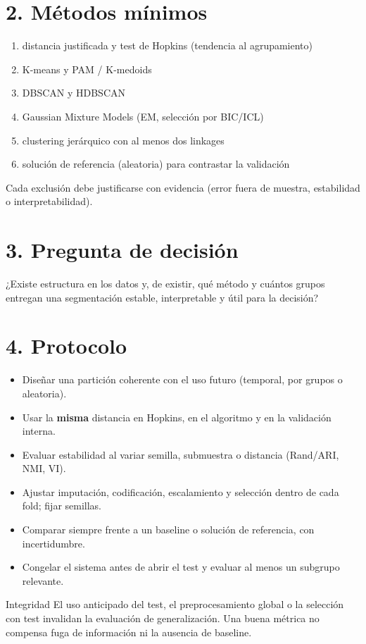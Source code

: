 \documentclass[11pt,letterpaper]{article}
\begin{document}
\section*{2. Métodos mínimos}
\begin{enumerate}
\item distancia justificada y test de Hopkins (tendencia al agrupamiento)
\item K-means y PAM / K-medoids
\item DBSCAN y HDBSCAN
\item Gaussian Mixture Models (EM, selección por BIC/ICL)
\item clustering jerárquico con al menos dos linkages
\item solución de referencia (aleatoria) para contrastar la validación
\end{enumerate}
Cada exclusión debe justificarse con evidencia (error fuera de muestra, estabilidad o interpretabilidad).

\section*{3. Pregunta de decisión}
¿Existe estructura en los datos y, de existir, qué método y cuántos grupos entregan una segmentación
estable, interpretable y útil para la decisión?

\section*{4. Protocolo}
\begin{itemize}
\item Diseñar una partición coherente con el uso futuro (temporal, por grupos o aleatoria).
\item Usar la \textbf{misma} distancia en Hopkins, en el algoritmo y en la validación interna.
\item Evaluar estabilidad al variar semilla, submuestra o distancia (Rand/ARI, NMI, VI).
\item Ajustar imputación, codificación, escalamiento y selección dentro de cada fold; fijar semillas.
\item Comparar siempre frente a un baseline o solución de referencia, con incertidumbre.
\item Congelar el sistema antes de abrir el test y evaluar al menos un subgrupo relevante.
\end{itemize}
\begin{alertbox}{Integridad}
El uso anticipado del test, el preprocesamiento global o la selección con test invalidan la evaluación de generalización. Una buena métrica no compensa fuga de información ni la ausencia de baseline.
\end{alertbox}
\end{document}
